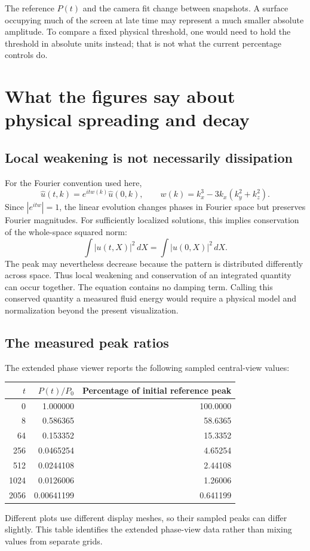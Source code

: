 \documentclass[10pt]{article}
\begin{document}
The reference $P(t)$ and the camera fit change between snapshots. A surface occupying much of the screen at late time may represent a much smaller absolute amplitude. To compare a fixed physical threshold, one would need to hold the threshold in absolute units instead; that is not what the current percentage controls do.

\section{What the figures say about physical spreading and decay}
\subsection{Local weakening is not necessarily dissipation}
For the Fourier convention used here,
\begin{equation}
 \widehat u(t,k)=e^{itw(k)}\widehat u(0,k),\qquad
 w(k)=k_x^3-3k_x(k_y^2+k_z^2).
\end{equation}
Since $|e^{itw}|=1$, the linear evolution changes phases in Fourier space but preserves Fourier magnitudes. For sufficiently localized solutions, this implies conservation of the whole-space squared norm:
\begin{equation}
 \int |u(t,X)|^2\,dX=\int |u(0,X)|^2\,dX.
\end{equation}
The peak may nevertheless decrease because the pattern is distributed differently across space. Thus local weakening and conservation of an integrated quantity can occur together. The equation contains no damping term. Calling this conserved quantity a measured fluid energy would require a physical model and normalization beyond the present visualization.

\subsection{The measured peak ratios}
The extended phase viewer reports the following sampled central-view values:
\begin{center}
\begin{tabular}{rrr}
\toprule
$t$ & $P(t)/P_0$ & Percentage of initial reference peak\\
\midrule
0 & 1.000000 & 100.0000\\
8 & 0.586365 & 58.6365\\
64 & 0.153352 & 15.3352\\
256 & 0.0465254 & 4.65254\\
512 & 0.0244108 & 2.44108\\
1024 & 0.0126006 & 1.26006\\
2056 & 0.00641199 & 0.641199\\
\bottomrule
\end{tabular}
\end{center}
Different plots use different display meshes, so their sampled peaks can differ slightly. This table identifies the extended phase-view data rather than mixing values from separate grids.
\end{document}
